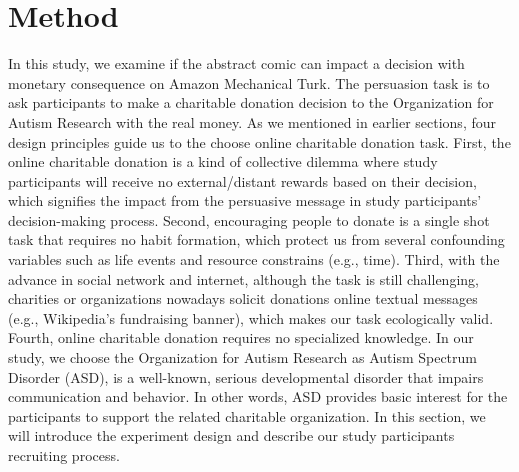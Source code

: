 \section{Method}
\label{sec:Method}
In this study, we examine if the abstract comic can impact a decision with monetary consequence on Amazon Mechanical Turk. The persuasion task is to ask participants to make a charitable donation decision to the Organization for Autism Research with the real money. As we mentioned in earlier sections, four design principles guide us to the choose online charitable donation task. First, the online charitable donation is a kind of collective dilemma where study participants will receive no external/distant rewards based on their decision, which signifies the impact from the persuasive message in study participants' decision-making process. Second, encouraging people to donate is a single shot task that requires no habit formation, which protect us from several confounding variables such as life events and resource constrains (e.g., time). Third, with the advance in social network and internet, although the task is still challenging, charities or organizations nowadays solicit donations online textual messages (e.g., Wikipedia's fundraising banner), which makes our task ecologically valid. Fourth, online charitable donation requires no specialized knowledge. In our study, we choose the Organization for Autism Research as Autism Spectrum Disorder (ASD), is a well-known, serious developmental disorder that impairs communication and behavior. In other words, ASD provides basic interest for the participants to support the related charitable organization. In this section, we will introduce the experiment design and describe our study participants recruiting process.


